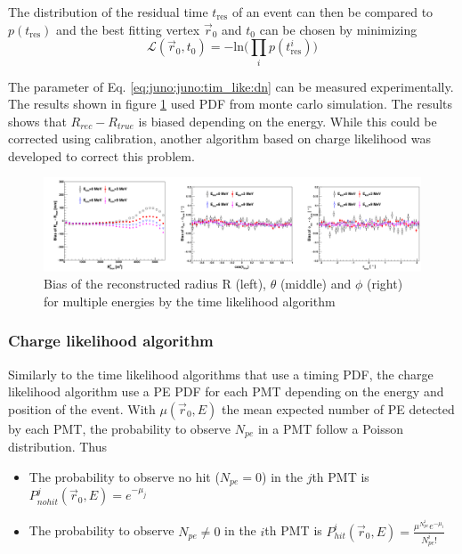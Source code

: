 \documentclass[../main.tex]{subfiles}
\begin{document}
The distribution of the residual time $t_{\mathrm{res}}$ of an event can then be compared to $p(t_{\mathrm{res}})$ and the best fitting vertex $\vec{r}_0$ and $t_0$ can be chosen by minimizing
\begin{equation}
  \mathcal{L}(\vec{r}_0, t_0) = - \mathrm{ln} \bigg(\prod_i p(t^i_{\mathrm{res}}) \bigg)
\end{equation}

The parameter of Eq. \ref{eq:juno:juno:tim_like:dn} can be measured experimentally. The results shown in figure \ref{fig:juno:rec:time_likelihood} used PDF from monte carlo simulation. The results shows that $R_{rec} - R_{true}$ is biased depending on the energy. While this could be corrected using calibration, another algorithm based on charge likelihood was developed to correct this problem.

\begin{figure}[ht]
  \centering
  \includegraphics[width=\linewidth]{images/juno/reco/time_likelihood_results.png}
  \caption{Bias of the reconstructed radius R (left), $\theta$ (middle) and $\phi$ (right) for multiple energies by the time likelihood algorithm}
  \label{fig:juno:rec:time_likelihood}
\end{figure}


\subsubsection{Charge likelihood algorithm}

Similarly to the time likelihood algorithms that use a timing PDF, the charge likelihood algorithm use a PE PDF for each PMT depending on the energy and position of the event. With $\mu(\vec{r}_0, E)$ the mean expected number of PE detected by each PMT, the probability to observe $N_{pe}$ in a PMT follow a Poisson distribution. Thus
\begin{itemize}
  \item The probability to observe no hit ($N_{pe} = 0$) in the $j$th PMT is $P^{j}_{nohit} (\vec{r}_0, E) = e^{-\mu_j}$
  \item The probability to observe $N_{pe} \neq 0$ in the $i$th PMT is $P^{i}_{hit} (\vec{r}_0, E) = \frac{\mu^{N^i_{pe}} e^{-\mu_i}}{N^i_{pe}!}$
\end{itemize}
\end{document}

